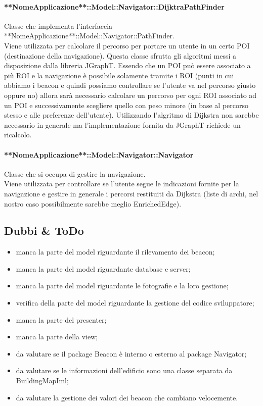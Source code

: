 \documentclass[../SpecificaTecnica.tex]{subfiles}
\begin{document}
				\paragraph{**NomeApplicazione**::Model::Navigator::DijktraPathFinder}
					Classe che implementa l'interfaccia **NomeApplicazione**::Model::Navigator::PathFinder. \\
					Viene utilizzata per calcolare il percorso per portare un utente in un certo POI (destinazione della navigazione). Questa classe sfrutta gli algoritmi messi a disposizione dalla libreria JGraphT. Essendo che un POI può essere associato a più ROI e la navigazione è possibile solamente tramite i ROI (punti in cui abbiamo i beacon e quindi possiamo controllare se l'utente va nel percorso giusto oppure no) allora sarà necessario calcolare un percorso per ogni ROI associato ad un POI e successivamente scegliere quello con peso minore (in base al percorso stesso e alle preferenze dell'utente). Utilizzando l'algritmo di Dijkstra non sarebbe necessario in generale ma l'implementazione fornita da JGraphT richiede un ricalcolo.
				\paragraph{**NomeApplicazione**::Model::Navigator::Navigator}
					Classe che si occupa di gestire la navigazione. \\
					Viene utilizzata per controllare se l'utente segue le indicazioni fornite per la navigazione e gestire in generale i percorsi restituiti da Dijkstra (liste di archi, nel nostro caso possibilmente sarebbe meglio EnrichedEdge).
	\subsection{Dubbi \& ToDo}
		\begin{itemize}
			\item manca la parte del model riguardante il rilevamento dei beacon;
			\item manca la parte del model riguardante database e server;
			\item manca la parte del model riguardante le fotografie e la loro gestione;
			\item verifica della parte del model riguardante la gestione del codice sviluppatore;
			\item manca la parte del presenter;
			\item manca la parte della view;
			\item da valutare se il package Beacon è interno o esterno al package Navigator;
			\item da valutare se le informazioni dell'edificio sono una classe separata da BuildingMapIml;
			\item da valutare la gestione dei valori dei beacon che cambiano velocemente.
		\end{itemize}
\end{document}
